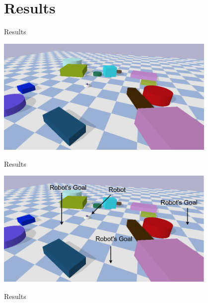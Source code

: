 \section{Results}
\begin{frame}[fragile]{Results} 
\begin{center}
 \includegraphics[width=0.8\textwidth]{figures/results/random1}
\end{center}
\end{frame}

\begin{frame}[fragile]{Results} 
\begin{center}
 \includegraphics[width=0.8\textwidth]{figures/results/random1_with_target}
\end{center}
\end{frame}

\begin{frame}[fragile]{Results} 
\begin{figure}
  \centering
  \quad
\end{figure}
\end{frame}

